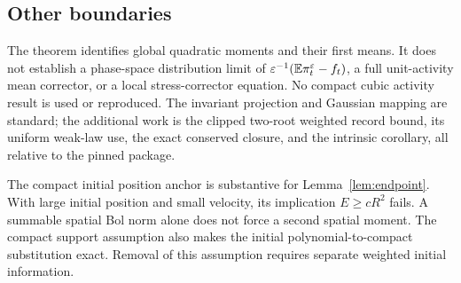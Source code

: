 \subsection{Other boundaries}
The theorem identifies global quadratic moments and their first means.
It does not establish a phase-space distribution limit of
$\varepsilon^{-1}(\mathbb E\pi_t^\varepsilon-f_t)$, a full unit-activity mean corrector,
or a local stress-corrector equation. No compact cubic activity result
is used or reproduced. The invariant projection and Gaussian mapping are
standard; the additional work is the clipped two-root weighted record
bound, its uniform weak-law use, the exact conserved closure, and the
intrinsic corollary, all relative to the pinned package.

The compact initial position anchor is substantive for
Lemma~\ref{lem:endpoint}. With large initial position and small velocity,
its implication $E\ge cR^2$ fails. A summable spatial Bol norm alone
does not force a second spatial moment. The compact support assumption
also makes the initial polynomial-to-compact substitution exact.
Removal of this assumption requires separate weighted initial information.
